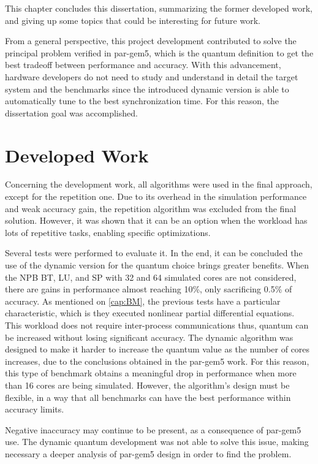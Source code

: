 

This chapter concludes this dissertation, summarizing the former developed work, and giving up some topics that could be
interesting for future work.

From a general perspective, this project development contributed to solve the principal problem verified in par-gem5, which is the 
quantum definition to get the best tradeoff between performance and accuracy. With this advancement, hardware developers do not 
need to study and understand in detail the target system and the benchmarks since the introduced dynamic version is able to 
automatically tune to the best synchronization time. For this reason, the dissertation goal was accomplished. 

\section{Developed Work}

Concerning the development work, all algorithms were used in the final approach, except for the repetition one. Due to its overhead in the 
simulation performance and weak accuracy gain, the repetition algorithm was excluded from the final solution. However, it was shown 
that it can be an option when the workload has lots of repetitive tasks, enabling specific optimizations.

Several tests were performed to evaluate it. In the end, it can be concluded the use of the dynamic version for the quantum choice brings 
greater benefits. When the NPB BT, LU, and SP with 32 and 64 simulated cores are not considered, there are gains in performance almost 
reaching 10\%, only sacrificing 0.5\% of accuracy. As mentioned on \autoref{cap:BM}, the previous tests have a particular characteristic, 
which is they executed nonlinear partial differential equations. This workload does not require inter-process communications thus, 
quantum can be increased without losing significant accuracy. The dynamic algorithm was designed to make it harder to increase the 
quantum value as the number of cores increases, due to the conclusions obtained in the par-gem5 \cite*{pargem5} work. For this reason, 
this type of benchmark obtains a meaningful drop in performance when more than 16 cores are being simulated. However, the 
algorithm's design must be flexible, in a way that all benchmarks can have the best performance within accuracy limits.

Negative inaccuracy may continue to be present, as a consequence of par-gem5 use. The dynamic quantum development was not able to solve this
issue, making necessary a deeper analysis of par-gem5 design in order to find the problem. 


